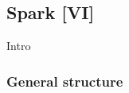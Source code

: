 \subsection{Spark [VI]}

Intro

\cite{Zaharia2010}
\cite{Zaharia2013}
\cite{Spark}

\subsubsection{General structure}

